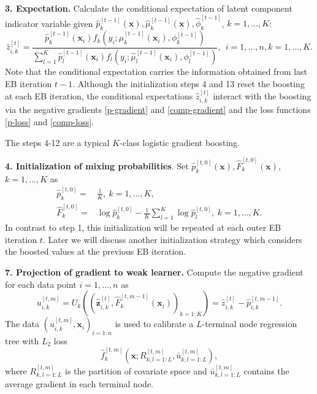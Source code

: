 \documentclass[11pt]{article}
\numberwithin{equation}{section}
\def\bx{\boldsymbol{x}}
\def\bz{\boldsymbol{z}}
\begin{document}
{\bf 3. Expectation.} Calculate the conditional expectation of latent component indicator variable given  $\hat{p}^{[t-1]}_k(\bx),\hat{\mu}^{[t-1]}_k(\bx),\hat{\phi}^{[t-1]}_k$, $k=1,\ldots,K$:
	\begin{equation*}
		\hat{z}_{i,k}^{[t]}=\frac{\hat{p}_{k}^{[t-1]}(\bx_i) f_{k}\left(y_i ; \hat{\mu}_{k}^{[t-1]}(\bx_i), \phi_k^{[t-1]} \right)}{\sum_{l=1}^{K} \hat{p}_{l}^{[t-1]}(\bx_i) f_{l}\left(y_i ; \hat{\mu}_{l}^{[t-1]}(\bx_i), \phi_l^{[t-1]}\right)},~~ i=1,\ldots,n, k=1,\ldots,K.
	\end{equation*}
Note that the conditional expectation carries the information obtained from last EB iteration $t-1$.
Although the initialization steps 4 and 13 reset the boosting at each EB iteration, the conditional expectations $\hat{z}_{i,k}^{[t]}$ interact with the boosting via the negative gradients \eqref{p-gradient} and \eqref{comp-gradient} and the loss functions \eqref{p-loss} and \eqref{comp-loss}. 

The steps 4-12 are a typical $K$-class logistic gradient boosting. 

{\bf  4. Initialization of mixing probabilities}. 
Set $\hat{p}_k^{[t,0]}(\bx),\hat{F}_{k}^{[t,0]}(\bx)$, $k=1,\ldots,K$ as
		\begin{equation}\label{ini-1}			
			\begin{aligned}
			\hat{p}_k^{[t,0]}=&\frac{1}{K}, ~k=1,\ldots,K,\\
		\hat{F}_k^{[t,0]}=&\log \hat{p}_k^{[t,0]}-\frac{1}{K}\sum_{l=1}^K\log \hat{p}_l^{[t,0]}, ~ k=1,\ldots,K.
		\end{aligned}
	\end{equation}
		In contrast to step 1, this initialization will be repeated at each outer EB iteration $t$. Later we will discuss another initialization strategy which considers the boosted values at the previous EB iteration.
		
{\bf 7. Projection of gradient to weak learner.}
		Compute the negative gradient for each data point $i=1,\ldots,n$ as
		$$u_{i,k}^{[t,m]}=U_k\left(\left(\hat{\bz}_{i,k}^{[t]},\hat{F}_k^{[t,m-1]}(\bx_i)\right)_{k=1:K}\right)=\hat{z}_{i,k}^{[t]}-\hat{p}_{i,k}^{[t,m-1]}.$$
		The data $(u_{i,k}^{[t,m]},\bx_i)_{i=1:n}$ is used to calibrate a $L$-terminal node regression tree with $L_2$ loss $$\hat{f}_k^{[t,m]}\left(\bx;R^{[t,m]}_{k,l=1:L},\bar{u}^{[t,m]}_{k,l=1:L}\right),$$
		where $R^{[t,m]}_{k,l=1:L}$ is the partition of covariate space and $\bar{u}^{[t,m]}_{k,l=1:L}$ contains the average gradient in each terminal node.
		
\end{document}
